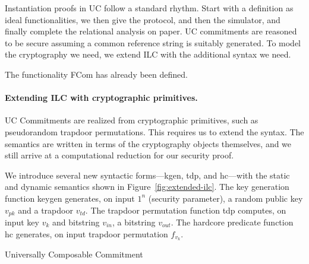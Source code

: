 Instantiation proofs in UC follow a standard rhythm. Start with a definition as ideal functionalities, we then give the protocol, and then the simulator, and finally complete the relational analysis on paper.
UC commitments are reasoned to be secure assuming a common reference string is suitably generated.
To model the cryptography we need, we extend ILC with the additional syntax we need.

The functionality FCom has already been defined.

\paragraph{Extending ILC with cryptographic primitives.}
UC Commitments are realized from cryptographic primitives, such as pseudorandom trapdoor permutations. This requires us to extend the syntax. The semantics are written in terms of the cryptography objects themselves, and we still arrive at a computational reduction for our security proof.

We introduce several new syntactic forms---\textsf{kgen}, \textsf{tdp}, and
\textsf{hc}---with the static and dynamic semantics shown in
Figure~\ref{fig:extended-ilc}.
The key generation function \textsf{keygen} generates, on input $1^n$ (security
parameter), a random public key $v_{pk}$ and a trapdoor $v_{td}$. The trapdoor
permutation function \textsf{tdp} computes, on input key $v_k$ and bitstring
$v_{in}$, a bitstring $v_{out}$. The hardcore predicate function \textsf{hc}
generates, on input trapdoor permutation $f_{v_k}$.



\begin{algorithm}
\DontPrintSemicolon

\smallskip
{}
\smallskip

\caption{Universally Composable Commitment}
\label{alg:com}
\end{algorithm}

